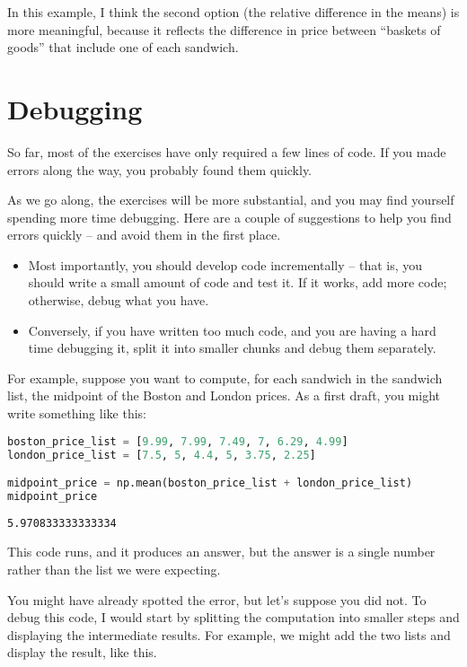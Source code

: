 \documentclass[
]{book}
\begin{document}
In this example, I think the second option (the relative difference in
the means) is more meaningful, because it reflects the difference in
price between ``baskets of goods'' that include one of each sandwich.

\section{Debugging}\label{debugging}

So far, most of the exercises have only required a few lines of code. If
you made errors along the way, you probably found them quickly.

As we go along, the exercises will be more substantial, and you may find
yourself spending more time debugging. Here are a couple of suggestions
to help you find errors quickly -- and avoid them in the first place.

\begin{itemize}
\item
  Most importantly, you should develop code incrementally -- that is,
  you should write a small amount of code and test it. If it works, add
  more code; otherwise, debug what you have.
\item
  Conversely, if you have written too much code, and you are having a
  hard time debugging it, split it into smaller chunks and debug them
  separately.
\end{itemize}

For example, suppose you want to compute, for each sandwich in the
sandwich list, the midpoint of the Boston and London prices. As a first
draft, you might write something like this:

\begin{lstlisting}[language=Python]
boston_price_list = [9.99, 7.99, 7.49, 7, 6.29, 4.99]
london_price_list = [7.5, 5, 4.4, 5, 3.75, 2.25]

midpoint_price = np.mean(boston_price_list + london_price_list)
midpoint_price
\end{lstlisting}

\begin{lstlisting}
5.970833333333334
\end{lstlisting}

This code runs, and it produces an answer, but the answer is a single
number rather than the list we were expecting.

You might have already spotted the error, but let's suppose you did not.
To debug this code, I would start by splitting the computation into
smaller steps and displaying the intermediate results. For example, we
might add the two lists and display the result, like this.
\end{document}
